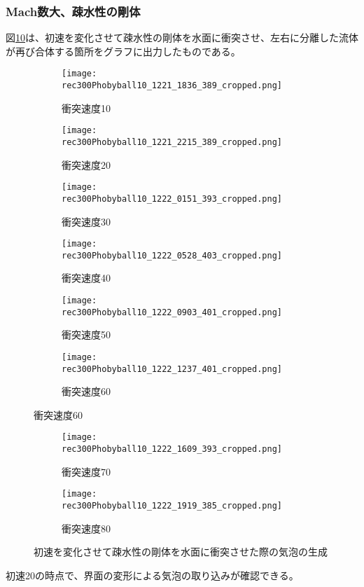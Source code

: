\documentclass[]{jsarticle}
\begin{document}
\subsubsection{Mach数大、疎水性の剛体}
図\ref{fig:hydrophobic}は、初速を変化させて疎水性の剛体を水面に衝突させ、左右に分離した流体が再び合体する箇所をグラフに出力したものである。
\begin{figure}[H]
  \centering
\begin{subfigure}{0.3\columnwidth}
  \centering
  \texttt{[image: rec300Phobyball10\_1221\_1836\_389\_cropped.png]}
  \caption{衝突速度10}
  \label{fig:vel10}
\end{subfigure}
\begin{subfigure}{0.3\columnwidth}
  \centering
  \texttt{[image: rec300Phobyball10\_1221\_2215\_389\_cropped.png]}
  \caption{衝突速度20}
  \label{fig:vel20}
\end{subfigure}
\begin{subfigure}{0.3\columnwidth}
  \centering
  \texttt{[image: rec300Phobyball10\_1222\_0151\_393\_cropped.png]}
  \caption{衝突速度30}
  \label{fig:vel30}
\end{subfigure}
\begin{subfigure}{0.3\columnwidth}
  \centering
  \texttt{[image: rec300Phobyball10\_1222\_0528\_403\_cropped.png]}
  \caption{衝突速度40}
  \label{fig:vel40}
\end{subfigure}
\begin{subfigure}{0.3\columnwidth}
  \centering
  \texttt{[image: rec300Phobyball10\_1222\_0903\_401\_cropped.png]}
  \caption{衝突速度50}
  \label{fig:vel50}
\end{subfigure}
\begin{subfigure}{0.3\columnwidth}
  \centering
  \texttt{[image: rec300Phobyball10\_1222\_1237\_401\_cropped.png]}
  \caption{衝突速度60}
  \label{fig:vel60}
\end{subfigure}
\end{figure}
\clearpage
\begin{figure}
\ContinuedFloat
  \begin{subfigure}{0.3\columnwidth}
  \centering
  \texttt{[image: rec300Phobyball10\_1222\_1609\_393\_cropped.png]}
  \caption{衝突速度70}
  \label{fig:vel70}
\end{subfigure}
\begin{subfigure}{0.3\columnwidth}
  \centering
  \texttt{[image: rec300Phobyball10\_1222\_1919\_385\_cropped.png]}
  \caption{衝突速度80}
  \label{fig:vel80}
\end{subfigure}
\caption{初速を変化させて疎水性の剛体を水面に衝突させた際の気泡の生成}
\label{fig:hydrophobic}
\end{figure}
初速20の時点で、界面の変形による気泡の取り込みが確認できる。
\end{document}
